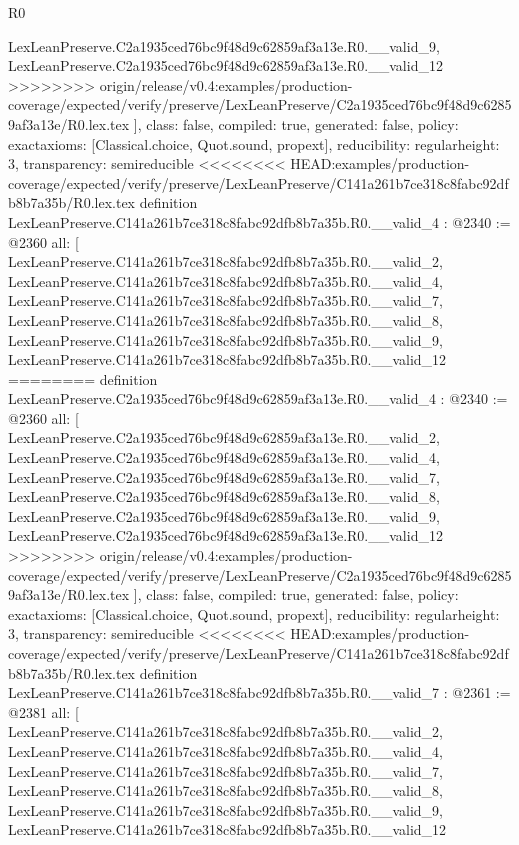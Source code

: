 \begin{lexlean}{R0}
\begin{coremodule}
{{{{{{{{{{{{{{{{{{{{{{{{{{{{{{{{{{{{{{{{{{{{{    LexLeanPreserve.C2a1935ced76bc9f48d9c62859af3a13e.R0.__valid_9,
    LexLeanPreserve.C2a1935ced76bc9f48d9c62859af3a13e.R0.__valid_12
>>>>>>>> origin/release/v0.4:examples/production-coverage/expected/verify/preserve/LexLeanPreserve/C2a1935ced76bc9f48d9c62859af3a13e/R0.lex.tex
  ],
  class: false,
  compiled: true,
  generated: false,
  policy: exact{axioms: [Classical.choice, Quot.sound, propext]},
  reducibility: regular{height: 3},
  transparency: semireducible
}
<<<<<<<< HEAD:examples/production-coverage/expected/verify/preserve/LexLeanPreserve/C141a261b7ce318c8fabc92dfb8b7a35b/R0.lex.tex
definition LexLeanPreserve.C141a261b7ce318c8fabc92dfb8b7a35b.R0.__valid_4 : @2340 := @2360 {
  all: [
    LexLeanPreserve.C141a261b7ce318c8fabc92dfb8b7a35b.R0.__valid_2,
    LexLeanPreserve.C141a261b7ce318c8fabc92dfb8b7a35b.R0.__valid_4,
    LexLeanPreserve.C141a261b7ce318c8fabc92dfb8b7a35b.R0.__valid_7,
    LexLeanPreserve.C141a261b7ce318c8fabc92dfb8b7a35b.R0.__valid_8,
    LexLeanPreserve.C141a261b7ce318c8fabc92dfb8b7a35b.R0.__valid_9,
    LexLeanPreserve.C141a261b7ce318c8fabc92dfb8b7a35b.R0.__valid_12
========
definition LexLeanPreserve.C2a1935ced76bc9f48d9c62859af3a13e.R0.__valid_4 : @2340 := @2360 {
  all: [
    LexLeanPreserve.C2a1935ced76bc9f48d9c62859af3a13e.R0.__valid_2,
    LexLeanPreserve.C2a1935ced76bc9f48d9c62859af3a13e.R0.__valid_4,
    LexLeanPreserve.C2a1935ced76bc9f48d9c62859af3a13e.R0.__valid_7,
    LexLeanPreserve.C2a1935ced76bc9f48d9c62859af3a13e.R0.__valid_8,
    LexLeanPreserve.C2a1935ced76bc9f48d9c62859af3a13e.R0.__valid_9,
    LexLeanPreserve.C2a1935ced76bc9f48d9c62859af3a13e.R0.__valid_12
>>>>>>>> origin/release/v0.4:examples/production-coverage/expected/verify/preserve/LexLeanPreserve/C2a1935ced76bc9f48d9c62859af3a13e/R0.lex.tex
  ],
  class: false,
  compiled: true,
  generated: false,
  policy: exact{axioms: [Classical.choice, Quot.sound, propext]},
  reducibility: regular{height: 3},
  transparency: semireducible
}
<<<<<<<< HEAD:examples/production-coverage/expected/verify/preserve/LexLeanPreserve/C141a261b7ce318c8fabc92dfb8b7a35b/R0.lex.tex
definition LexLeanPreserve.C141a261b7ce318c8fabc92dfb8b7a35b.R0.__valid_7 : @2361 := @2381 {
  all: [
    LexLeanPreserve.C141a261b7ce318c8fabc92dfb8b7a35b.R0.__valid_2,
    LexLeanPreserve.C141a261b7ce318c8fabc92dfb8b7a35b.R0.__valid_4,
    LexLeanPreserve.C141a261b7ce318c8fabc92dfb8b7a35b.R0.__valid_7,
    LexLeanPreserve.C141a261b7ce318c8fabc92dfb8b7a35b.R0.__valid_8,
    LexLeanPreserve.C141a261b7ce318c8fabc92dfb8b7a35b.R0.__valid_9,
    LexLeanPreserve.C141a261b7ce318c8fabc92dfb8b7a35b.R0.__valid_12
}}}}}}}}}}}}}}}}}}}}}}}}}}}}}}}}}}}}}}}}}}}}}}
\end{coremodule}
\end{lexlean}
